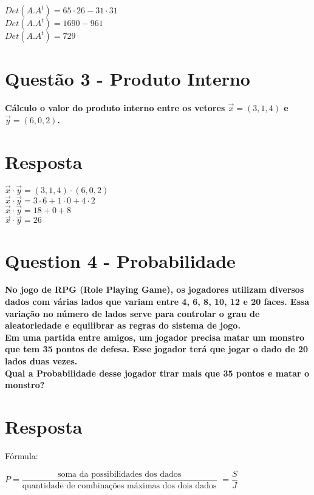 \documentclass[a4paper, 12pt]{article}
\begin{document}
    \begin{center}
      $Det(A.A^t)= 65 \cdot 26 - 31 \cdot 31$  \\
      $Det(A.A^t) = 1690 - 961 $ \\
      $Det(A.A^t) = 729$
    \end{center}

\section*{Questão 3 - Produto Interno}
{\bfseries Cálculo o valor do produto interno entre os vetores $ 
\vec{x} = (3,1,4)$ 
e $ \vec{y} = (6,0,2)$.

\section*{Resposta}
\begin{center}
  $\vec{x} \cdot \vec{y} = (3,1,4) \cdot (6,0,2) $ \\
  $\vec{x} \cdot \vec{y} = 3 \cdot 6 + 1 \cdot 0 + 4 \cdot 2$ \\
  $\vec{x} \cdot \vec{y} = 18 + 0 + 8$ \\
  $\vec{x} \cdot \vec{y} = 26$
\end{center}
\newpage
\section*{Question 4 - Probabilidade}
{\bfseries 
  No jogo de RPG (Role Playing Game), os jogadores utilizam diversos dados com várias lados que variam entre 4, 6, 8, 10, 12 e 20 faces. Essa variação no número de lados serve para controlar o grau de aleatoriedade e equilibrar as regras do sistema de jogo.\\
  Em uma partida entre amigos, um jogador precisa matar um monstro que tem 35 pontos de defesa. Esse jogador terá que jogar o dado de 20 lados duas vezes.\\
  Qual a Probabilidade desse jogador tirar mais que 35 pontos e matar o monstro?
  }

  \section*{Resposta}

  Fórmula:
  \newline
  \begin{center}
  $P = \dfrac{\text{soma da possibilidades dos dados}}{\text{quantidade de combinações máximas dos dois dados}}$ 
  $= \dfrac{S}{J}$
  \newline
\end{center}


}
\end{document}
